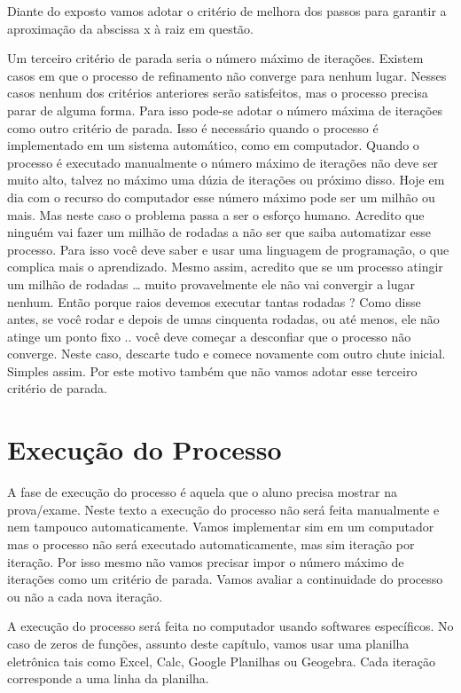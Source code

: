 \documentclass[
  letterpaper,
  DIV=11,
  numbers=noendperiod]{scrreprt}
\begin{document}
Diante do exposto vamos adotar o critério de melhora dos passos para
garantir a aproximação da abscissa x à raiz em questão.

Um terceiro critério de parada seria o número máximo de iterações.
Existem casos em que o processo de refinamento não converge para nenhum
lugar. Nesses casos nenhum dos critérios anteriores serão satisfeitos,
mas o processo precisa parar de alguma forma. Para isso pode-se adotar o
número máxima de iterações como outro critério de parada. Isso é
necessário quando o processo é implementado em um sistema automático,
como em computador. Quando o processo é executado manualmente o número
máximo de iterações não deve ser muito alto, talvez no máximo uma dúzia
de iterações ou próximo disso. Hoje em dia com o recurso do computador
esse número máximo pode ser um milhão ou mais. Mas neste caso o problema
passa a ser o esforço humano. Acredito que ninguém vai fazer um milhão
de rodadas a não ser que saiba automatizar esse processo. Para isso você
deve saber e usar uma linguagem de programação, o que complica mais o
aprendizado. Mesmo assim, acredito que se um processo atingir um milhão
de rodadas \ldots{} muito provavelmente ele não vai convergir a lugar
nenhum. Então porque raios devemos executar tantas rodadas ? Como disse
antes, se você rodar e depois de umas cinquenta rodadas, ou até menos,
ele não atinge um ponto fixo .. você deve começar a desconfiar que o
processo não converge. Neste caso, descarte tudo e comece novamente com
outro chute inicial. Simples assim. Por este motivo também que não vamos
adotar esse terceiro critério de parada.

\section{Execução do Processo}\label{execuuxe7uxe3o-do-processo}

A fase de execução do processo é aquela que o aluno precisa mostrar na
prova/exame. Neste texto a execução do processo não será feita
manualmente e nem tampouco automaticamente. Vamos implementar sim em um
computador mas o processo não será executado automaticamente, mas sim
iteração por iteração. Por isso mesmo não vamos precisar impor o número
máximo de iterações como um critério de parada. Vamos avaliar a
continuidade do processo ou não a cada nova iteração.

A execução do processo será feita no computador usando softwares
específicos. No caso de zeros de funções, assunto deste capítulo, vamos
usar uma planilha eletrônica tais como Excel, Calc, Google Planilhas ou
Geogebra. Cada iteração corresponde a uma linha da planilha.
\end{document}
